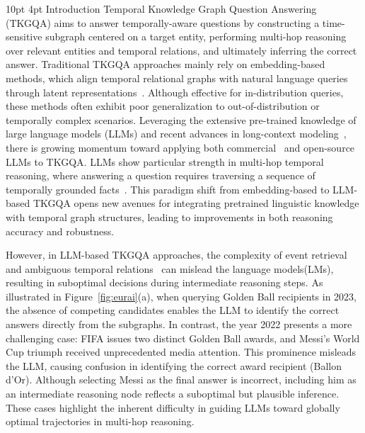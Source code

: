 \documentclass[letterpaper]{article} %
\makeatletter
\renewcommand{\section}{%
  \@startsection{section}{1}{\z@}%
  {10pt} %
  {4pt}  %
  {\centering\bfseries\large}%
}
\makeatother
\begin{document}
\section{Introduction}
Temporal Knowledge Graph Question Answering (TKGQA) aims to answer temporally-aware questions by constructing a time-sensitive subgraph centered on a target entity, performing multi-hop reasoning over relevant entities and temporal relations, and ultimately inferring the correct answer. Traditional TKGQA approaches mainly rely on embedding-based methods, which align temporal relational graphs with natural language queries through latent representations~\cite{CHEN2022109134, mhm, MGT}. Although effective for in-distribution queries, these methods often exhibit poor generalization to out-of-distribution or temporally complex scenarios. Leveraging the extensive pre-trained knowledge of large language models (LLMs) and recent advances in long-context modeling~\cite{RoFormer, PI}, there is growing momentum toward applying both commercial~\cite{achiam2023gpt} and open-source~\cite{touvron2023llama, yang2024qwen2.5} LLMs to TKGQA. LLMs show particular strength in multi-hop temporal reasoning, where answering a question requires traversing a sequence of temporally grounded facts~\cite{ARI, qianyihu-etal-2025-time}. This paradigm shift from embedding-based to LLM-based TKGQA opens new avenues for integrating pretrained linguistic knowledge with temporal graph structures, leading to improvements in both reasoning accuracy and robustness.

However, in LLM-based  TKGQA approaches, the complexity of event retrieval ~\cite{dziri, Rek} and ambiguous temporal relations~\cite{timer4, zha2024m} can mislead the language models(LMs), resulting in suboptimal decisions during intermediate reasoning steps. As illustrated in Figure~\ref{fig:eurai}(a), when querying Golden Ball recipients in 2023, the absence of competing candidates enables the LLM to identify the correct answers directly from the subgraphs. In contrast, the year 2022 presents a more challenging case: FIFA issues two distinct Golden Ball awards, and Messi’s World Cup triumph received unprecedented media attention. This prominence misleads the LLM, causing confusion in identifying the correct award recipient (Ballon d'Or). Although selecting Messi as the final answer is incorrect, including him as an intermediate reasoning node reflects a suboptimal but plausible inference. These cases highlight the inherent difficulty in guiding LLMs toward globally optimal trajectories in multi-hop reasoning.
\end{document}
